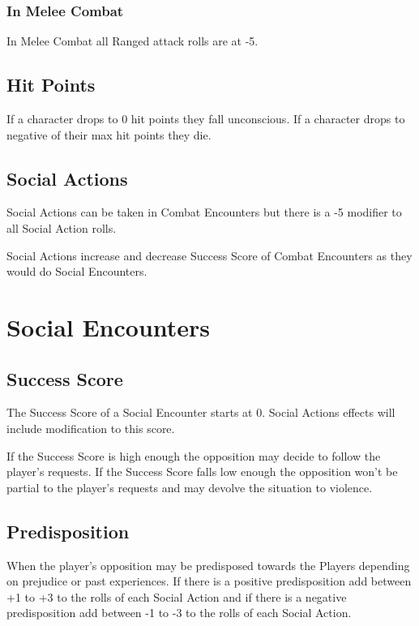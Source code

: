 \documentclass[a4paper,12pt,oneside]{book}
\begin{document}
                \subsubsection{In Melee Combat}
                    In Melee Combat all Ranged attack rolls are at -5.

            \subsection{Hit Points}
                If a character drops to 0 hit points they fall unconscious. If a character drops to negative of their max hit points they die.

            \subsection{Social Actions}
                Social Actions can be taken in Combat Encounters but there is a -5 modifier to all Social Action rolls.

                Social Actions increase and decrease Success Score of Combat Encounters as they would do Social Encounters.

        \section{Social Encounters}
            \subsection{Success Score}
                The Success Score of a Social Encounter starts at 0. Social Actions effects will include modification to this score.

                If the Success Score is high enough the opposition may decide to follow the player's requests. If the Success Score falls low enough the opposition won't be partial to the player's requests and may devolve the situation to violence.

            \subsection{Predisposition}
                When the player's opposition may be predisposed towards the Players depending on prejudice or past experiences. If there is a positive predisposition add between +1 to +3 to the rolls of each Social Action and if there is a negative predisposition add between -1 to -3 to the rolls of each Social Action.
\end{document}
